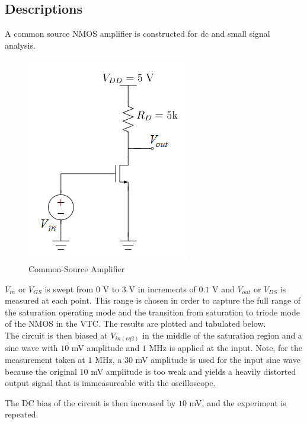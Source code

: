 \subsection{Descriptions}
A common source NMOS amplifier is constructed for dc and small signal analysis.

\FloatBarrier

\begin{figure}[h!]
	\centering
	\includegraphics[scale=0.75]{./images/circuit_2.PNG}
	\caption{Common-Source Amplifier}
	\label{fig:circuit_2}
\end{figure}

\FloatBarrier

$V_{in}$ or $V_{GS}$ is swept from $0$ \si{\volt} to $3$ \si{\volt} in increments of $0.1$ \si{\volt} and $V_{out}$ or $V_{DS}$ is measured at each point.
This range is chosen in order to capture the full range of the saturation operating mode and the transition from saturation to triode mode of the NMOS in the VTC.
The results are plotted and tabulated below. \\

The circuit is then biased at $V_{in(eq2)}$ in the middle of the saturation region and a sine wave with $10$ \si{\milli\volt} amplitude and $1$ \si{\mega\hertz} is applied at the input. Note, for the measurement taken at $1$ \si{\mega\hertz}, a $30$ \si{\milli\volt} amplitude is used for the input sine wave because the original $10$ \si{\milli\volt} amplitude is too weak and yields a heavily distorted output signal that is immeasureable with the oscilloscope.

The DC bias of the circuit is then increased by $10$ \si{\milli\volt}, and the experiment is repeated.

